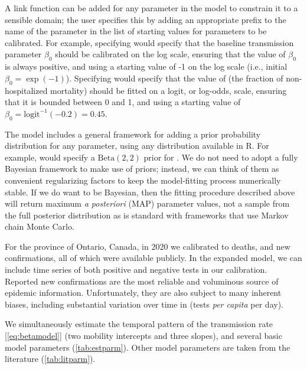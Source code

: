 \documentclass[12pt]{article}\usepackage[]{graphicx}\usepackage[]{color}
\begin{document}
A link function can be added for any parameter in the model to constrain it to a sensible domain; the user specifies this by adding an appropriate prefix to the name of the parameter in the list of starting values for parameters to be calibrated. 
For example, specifying  would specify that the baseline transmission parameter $\beta_0$ should be calibrated on the log scale, ensuring that the value of $\beta_0$ is always positive, and using a starting value of -1 on the log scale (i.e., initial $\beta_0 = \exp(-1)$). 
Specifying  would specify that the value of  (the fraction of non-hospitalized mortality) should be fitted on a logit, or log-odds, scale, ensuring that it is bounded between 0 and 1, and using a starting value of $\beta_0 = \textrm{logit}^{-1}(-0.2) = 0.45$.

The model includes a general framework for adding a prior probability distribution for any parameter, using any distribution available in R. 
For example,  would specify a $\textrm{Beta}(2,2)$ prior for .
We do not need to adopt a fully Bayesian framework to make use of priors; instead, we can think of them as convenient regularizing factors to keep the model-fitting process numerically stable. If we do want to be Bayesian, then the fitting procedure described above will return maximum \emph{a posteriori} (MAP) parameter values, not a sample from the full posterior distribution as is standard with frameworks that use Markov chain Monte Carlo.

For the province of Ontario, Canada, in 2020
we calibrated to deaths, and new confirmations, all of which were available publicly. 
In the expanded model, we can include time series of both positive and negative tests in our calibration. 
Reported new confirmations are the most reliable and voluminous source of epidemic information.
Unfortunately, they are also subject to many inherent biases, including substantial variation over time in  (\ie tests \emph{per capita} per day).

We simultaneously estimate the temporal pattern of the transmission rate [\cref{eq:betamodel}] (two mobility intercepts and three slopes), and several basic model parameters (\cref{tab:estparm}).
Other model parameters are taken from the literature (\cref{tab:litparm}).
\end{document}
